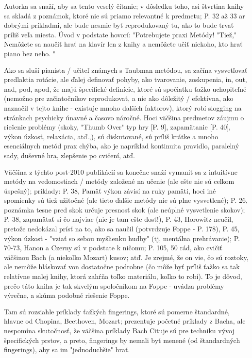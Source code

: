 \documentclass[11pt,a4paper%
]{article}
\begin{document}
Autorka sa snaží, aby sa tento veselý čítanie; v dôsledku toho, asi štvrtina knihy sa skladá z poznámok, ktoré nie sú priamo relevantné k predmetu; P. 32 až 33 ar dobrými príkladmi, ale bude nesmie byť reprodukovaný tu, ako to bude trvať príliš veľa miesta. Úvod v podstate hovorí: "Potrebujete praxi Metódy! "Tiež," Nemôžete sa naučiť hrať na klavír len z knihy a nemôžete učiť niekoho, kto hrať piano bez neho. " 

Ako sa sluší pianista / učiteľ známych s Taubman metódou, sa začína vysvetľovať predlaktia
rotácie, ale ďalej definovať pohyby, ako tvarovanie, zoskupenia, in, out, nad, pod, apod, že
majú špecifické definície, ktoré sú spočiatku ťažko uchopiteľné (nemožno pre začiatočníkov reprodukovať, a nie ako dôležitý / efektívna, ako naznačil v tejto knihe - existuje mnoho ďalších faktorov), ktorý robí slogging na stránkach psychicky únavné a časovo náročné. Hoci väčšina predmetov záujmu o riešenie problémy (skoky, "Thumb Over" typ hry [P. 9], zapamätanie [P. 40], výkon úzkosť, relaxácia, atď.,), sú diskutované, sú príliš krátke a mnoho esenciálnych metód prax chýba, ako je napríklad kontinuita pravidlo, paralelný sady, duševné hra, zlepšenie po cvičení, atď. 

Väčšina z týchto post-2010 publikácií sa konečne snaží vymaniť sa z intuitívne metódy na vedomostiach / metódy založené na učenie (ale ešte nie sú celkom úspešný); príklady: P. 38, Pamäť výkon závisí na ruky pamäti, hoci iné spomienky sú tiež užitočné (ale tieto ďalšie metódy nie sú plne vysvetlené); P. 26, poznámka tesne pred skok určuje presnosť skok (ale neúplné vysvetlenie skokov); P. 38, zapamätať si čo najviac (nie je tam ešte dosť!), P. 43, Horowitz neučil, pretože nedokázal prísť na to, ako sa naučil (potvrdzuje Foppe - P. 178), P. 45, výkon úzkosť - "vziať so sebou myšlienku hudby" (tj, mentálna prehrávanie); P. 70-73, Hanon a Czerny sú v podstate k ničomu; P. 105, 50 rád, ako cvičiť väčšinou Bach (a niekoľko Mozart) kusov; atď. Je zrejmé, že on vie, čo sú roztoky, ale nemôže hláskovať von dostatočne podrobne (čo môže byť príliš ťažko sa tak relatívne malej knihy, ktorá zahŕňa toľko materiálu, koľko to robí). To je dôvod, prečo táto kniha je tak skvelým spoločníkom na Foppe - uvádza problémy výrečne, a skúma podobné riešenie Foppe.

Tam sú rozsiahle príklady ťažkých fingerings, ktoré sú pomerne štandardné, hlavne od Chopina, Beethoven, Mozart; prezentuje početné príklady z Bacha, ale nespomína skutočnosť, že väčšina príklady Bach Cituje sú pre techniku ​​vývoj špecifických prstov, a preto, fingerings by nemali byť menené (od štandardných fingerings), aby sa im "jednoduchšie" hrať. 
\end{document}
